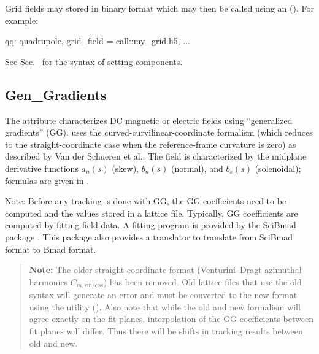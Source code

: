 Grid fields may stored in  binary format which may then be called using an 
(). For example:
\begin{example}
  qq: quadrupole, grid_field = call::my_grid.h5, ...
\end{example}

See Sec.~ for the syntax of setting  components.

\subsection{Gen_Gradients}
\label{s:gen.grad.map}

The  attribute characterizes DC magnetic or electric fields using ``generalized
gradients'' (GG). \bmad uses the curved-curvilinear-coordinate formalism (which reduces to the
straight-coordinate case when the reference-frame curvature is zero) as described by Van der Schueren
et al.\cite{b:gen.grad.curved}. The field is characterized by the midplane derivative functions
$a_n(s)$ (skew), $b_n(s)$ (normal), and $b_s(s)$ (solenoidal); formulas are given in
. 

Note: Before any tracking is done with GG, the GG coefficients need to be computed and the values
stored in a lattice file. Typically, GG coefficients are computed by fitting field data. A fitting
program is provided by the SciBmad package \cite{b:gen.grad.jl}. This
package also provides a translator to translate from SciBmad format to Bmad format.

\begin{quote}
\textbf{Note:} The older straight-coordinate  format (Venturini--Dragt azimuthal
harmonics $C_{m,\text{sin}/\text{cos}}$) has been removed. Old lattice files that use the old
 syntax will generate an error and must be converted to the new 
format using the  utility (). Also note
that while the old and new formalism will agree exactly on the fit planes, interpolation of the
GG coefficients between fit planes will differ. Thus there will be shifts in tracking results 
between old and new.
\end{quote}

